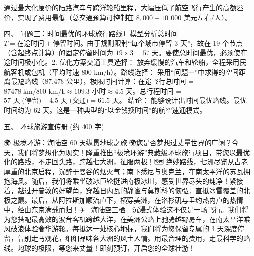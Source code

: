 通过最大化廉价的陆路汽车与跨洋轮船里程，大幅压低了航空飞行产生的高额溢价，实现了费用最低（总交通预算可控制在 $8,000 - 10,000$ 美元左右/人）。

四、 问题三：时间最优的环球旅行路线1. 模型分析总时间 $T = \text{在途时间} + \text{停留时间}$。由于规则限制“每个城市停留 3 天”，故在 19 个节点（含起终点计算）的固定停留时间为 $19 \times 3 = 57$ 天。要使总时间最优，必须使在途时间极小化。2. 优化方案交通工具选择： 放弃缓慢的汽车和轮船，全程采用民航客机或包机（平均时速 $800 \text{ km/h}$）。路线选择： 采用“问题一”中求得的空间距离最短路线（87,478 公里）。极限时间计算：在途飞行总时间 = $87478 \text{ km} / 800 \text{ km/h} \approx 109.3 \text{ 小时} \approx 4.5 \text{ 天}$。总行程时间 = $57 \text{ 天 (停留)} + 4.5 \text{ 天 (交通)} = 61.5 \text{ 天}$。
结论： 能够设计出时间最优路线。最优时间约为 62 天。这是一种典型的“以金钱换时间”的航空速通模式。

五、 环球旅游宣传册 (约 400 字)

🌍 极境环游：海陆空 60 天纵贯地球之旅 🌍您是否梦想过丈量世界的广阔？今天，我们将梦想化为现实！隆重推出“极境环游”典藏级环球旅行项目，带您以最优化的路线，不走回头路，跨越七大洲，征服两极！🗺️ 绝妙路线，七洲尽览从古老厚重的北京启程，沉醉于曼谷的烟火气；南下悉尼与奥克兰，在南太平洋的苏瓦拥抱海风。随后，我们将乘坐破冰巨轮挺进南极冰川，感受世界尽头的纯净！紧接着，越过开普敦的好望角，穿越日内瓦的静谧与莫斯科的恢弘，直抵冰雪覆盖的北极之巅。最后，从阿拉斯加顺流直下，横穿美洲，在洛杉矶与里约热内卢的热情中，经由东京满载而归！✈️🚢🚗 海陆空三栖，沉浸式体验这不仅是一场飞行。我们将为您搭配最高效的波音客机跨越大洋，在美洲公路上驰骋越野房车，在南太平洋乘风破浪体验奢华游轮。每抵达一处核心地标，我们将为您保留专属的 3 天深度停留，告别走马观花，细细品味各大洲的风土人情。用最合理的费用，走最科学的路线。地球的极限，等您来丈量！即刻预订，开启您的全球壮游！
